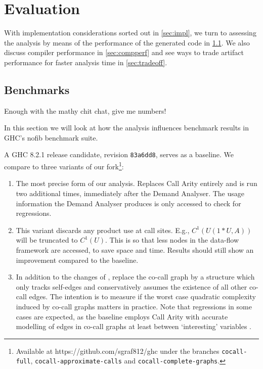\chapter{Evaluation}\label{sec:eval}

With implementation considerations sorted out in \cref{sec:impl}, we turn to assessing the analysis by means of the performance of the generated code in \cref{sec:bench}.
We also discuss compiler performance in \cref{sec:compperf} and see ways to trade artifact performance for faster analysis time in \cref{sec:tradeoff}.

\section{Benchmarks}\label{sec:bench}

Enough with the mathy chit chat, give me numbers!

In this section we will look at how the analysis influences benchmark results in GHC's nofib \parencite{nofib} benchmark suite.

A GHC 8.2.1 release candidate, revision \texttt{83a6dd8}, serves as a baseline. We compare to three variants of our fork\footnote{Available at https://github.com/sgraf812/ghc under the branches \texttt{cocall-full}, \texttt{cocall-approximate-calls} and \texttt{cocall-complete-graphs}.}:

\begin{enumerate}
  \item[\varfull] 
    The most precise form of our analysis. 
    Replaces Call Arity entirely and is run two additional times, immediately after the Demand Analyser. 
    The usage information the Demand Analyser produces is only accessed to check for regressions.
  \item[\varcalls]
    This variant discards any product use at call sites. 
    E.g., $C^1(U(1*U,A))$ will be truncated to $C^1(U)$. 
    This is so that less nodes in the data-flow framework are accessed, to save space and time.
    Results should still show an improvement compared to the baseline.
  \item[\varedges]
    In addition to the changes of \varcalls, replace the co-call graph by a structure which only tracks self-edges and conservatively assumes the existence of all other co-call edges.
    The intention is to measure if the worst case quadratic complexity induced by co-call graphs matters in practice.
    Note that regressions in some cases are expected, as the baseline employs Call Arity with accurate modelling of edges in co-call graphs at least between `interesting' variables \parencite[section~3.4.1]{callarity}.
\end{enumerate}


